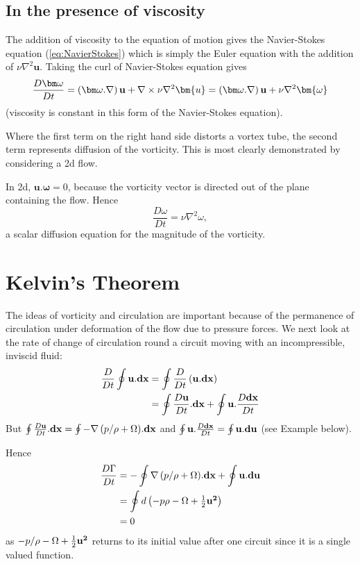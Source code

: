 \documentclass[10pt]{report}
\begin{document}
\subsection{In the presence of viscosity}

The addition of viscosity to the equation of motion gives the
Navier-Stokes equation (\ref{eq:NavierStokes}) which is simply the Euler equation with the addition
of $\nu \nabla^{2}{\bm{u}}$. Taking the curl of Navier-Stokes equation gives
\[
\frac{D{\bm \omega}}{Dt}=\left( {{\bm \omega}. \nabla } \right){{\bf u}} + \nabla \times \nu \nabla^{2} {\bm{u}} = \left( {{\bm \omega}. \nabla } \right){{\bf u}} + \nu \nabla^{2} {\bm{\omega}}
\]
(viscosity is constant in this form of the Navier-Stokes equation).

Where the first term on the right hand side distorts a vortex tube,
the second term represents diffusion of the vorticity.
This is most clearly demonstrated by considering a 2d flow.

In 2d, ${\bm u} . {\bm \omega} = 0$, because the vorticity vector is
directed out of the plane containing the flow. Hence
\[
\frac{D{\omega}}{Dt}= \nu \nabla^{2} {{\omega}},
\]
a scalar diffusion equation for the magnitude of the vorticity.



\section{Kelvin's Theorem}
The ideas of vorticity and circulation are important because of the
permanence of circulation under deformation of the flow due to pressure
forces. We next look at the rate of change of circulation round a circuit
moving with an incompressible, inviscid fluid:
\begin{align*}
 \frac{D}{Dt}\oint {{{\bf u}}. {{\bf dx}}} & =\oint
{\frac{D}{Dt}\left( {{{\bf u}}. {{\bf dx}}} \right)} \\
&  =\oint {\frac{D{{\bf u}}}{Dt}.
{{\bf dx}}} +\oint {{{\bf u}}. \frac{D{{\bf
dx}}}{Dt}} \\
 \end{align*}
 But $\oint {\frac{D{{\bf u}}}{Dt}. {{\bf dx}}} =\oint {-\nabla
\left( {p/  {\rho +\Omega }} \right)} . {{\bf dx}}$
and $\oint {{{\bf u}}. \frac{D{{\bf dx}}}{Dt}} =\oint
{{{\bf u}}. {{\bf du}}} $ (see Example below).

Hence
\begin{align*}
 \frac{D\Gamma }{Dt} & =-\oint {\nabla \left( {p/ {\rho +\Omega }}
\right)} . {{\bf dx}}+\oint {{{\bf u}}. {{\bf du}}} \\
&  =\oint {d\left( {{-p}  {\rho -\Omega +\textstyle{1 \over 2}{{\bf
u}}^{{\bf 2}}}} \right)} \\
 & =0 \\
 \end{align*}
as ${-p}/{\rho
-\Omega +\textstyle{1 \over 2}{{\bf u}}^{{\bf 2}}}$ returns to its
initial value after one circuit since it is a single valued function.
\end{document}
